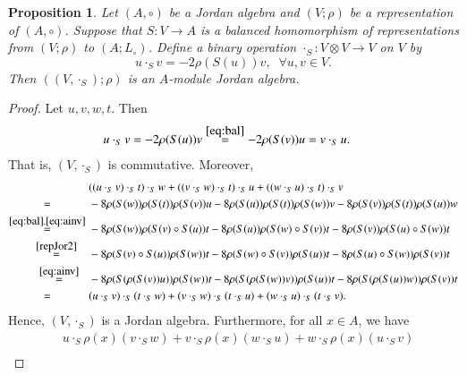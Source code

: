 \documentclass[12pt, reqno, a4paper]{amsart}
\newtheorem{proposition}[theorem]{Proposition}
\theoremstyle{definition}
\begin{document}
\begin{proposition}\label{prop:bae2aj}
	Let $(A, \circ)$ be a Jordan algebra and $(V; \rho)$ be a representation of $(A, \circ)$.
	Suppose that $S: V \to A$ is a balanced homomorphism of representations from $(V; \rho)$ to $(A; L_{\circ})$.
	Define a binary operation $\cdot_{S}: V \otimes V \to V$ on $V$ by
	\begin{equation}
		u \cdot_{S} v = - 2 \rho(S(u))v, \;\; \forall u, v \in V. \label{eq:bae2aj}
	\end{equation}
	Then $((V, \cdot_{S}); \rho)$ is an $A$-module Jordan algebra.
\end{proposition}
\begin{proof}
	Let $u, v, w, t$.
	Then
	\begin{align*}
		u \cdot_{S} v & = -2\rho(S(u))v \overset{\eqref{eq:bal}}{=} -2\rho(S(v))u = v \cdot_{S} u.
	\end{align*}
	That is, $(V, \cdot_{S})$ is commutative.
	Moreover,
	\begin{align*}
		& ((u \cdot_{S} v) \cdot_{S} t) \cdot_{S} w + ((v \cdot_{S} w) \cdot_{S} t) \cdot_{S} u+((w \cdot_{S} u) \cdot_{S} t) \cdot_{S} v \\
		\overset{\hphantom{\eqref{eq:bal},\eqref{eq:ainv}}}{=}\; & -8\rho(S(w))\rho(S(t)) \rho(S(v))u - 8\rho(S(u))\rho(S(t)) \rho(S(w))v -8\rho(S(v))\rho(S(t)) \rho(S(u))w \\
		\overset{\eqref{eq:bal},\eqref{eq:ainv}}{=}\;
		 & -8\rho(S(w))\rho(S(v) \circ S(u)) t -8\rho(S(u))\rho(S(w) \circ S(v)) t -8\rho(S(v))\rho(S(u) \circ S(w)) t                        \\
		\overset{\;\;\;\;\eqref{repJor2}\;\;\;\;}{=}\; & -8\rho(S(v) \circ S(u)) \rho(S(w)) t -8\rho(S(w) \circ S(v)) \rho(S(u))t - 8\rho(S(u) \circ S(w))\rho(S(v)) t                      \\
		\overset{\;\;\;\eqref{eq:ainv}\;\;\;}{=}\; & -8\rho(S( \rho(S(v)) u )) \rho(S(w)) t -8\rho(S( \rho(S(w)) v )) \rho(S(u)) t - 8\rho(S( \rho(S(u)) w )) \rho(S(v)) t \\
		\overset{\hphantom{\eqref{eq:bal},\eqref{eq:ainv}}}{=}\;  & (u \cdot_{S} v) \cdot_{S}(t \cdot_{S} w)+(v \cdot_{S} w) \cdot_{S}(t \cdot_{S} u)+(w \cdot_{S} u) \cdot_{S}(t \cdot_{S} v).
	\end{align*}
	Hence, $(V, \cdot_{S})$ is a Jordan algebra.
	Furthermore, for all $x \in A$, we have
	\begin{align*}
		& u \cdot_{S} \rho(x)(v \cdot_{S} w) + v \cdot_{S} \rho(x)(w \cdot_{S} u) + w \cdot_{S} \rho(x)(u \cdot_{S} v)\nonumber \\

\end{align*}
\end{proof}
\end{document}
